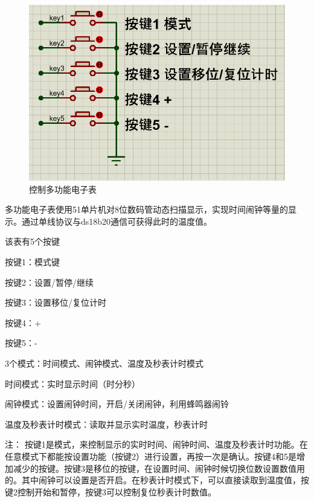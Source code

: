 \documentclass{textreportclass}  %
\begin{document}
	\begin{figure}[htbp]
		\centering
		\includegraphics[scale=0.3]{Fig/控制区二.png}
		\caption{控制多功能电子表}\label{Fig.37}
	\end{figure}
	
	多功能电子表使用51单片机对8位数码管动态扫描显示，实现时间闹钟等量的显示。通过单线协议与ds18b20通信可获得此时的温度值。
	
	该表有5个按键
	
	按键1：模式键
	
	按键2：设置/暂停/继续
	
	按键3：设置移位/复位计时
	
	按键4：+
	
	按键5：-
	
	3个模式：时间模式、闹钟模式、温度及秒表计时模式
	
	时间模式：实时显示时间（时分秒）
	
	闹钟模式：设置闹钟时间，开启/关闭闹钟，利用蜂鸣器闹铃
	
	温度及秒表计时模式：读取并显示实时温度，秒表计时
	
	注：
	按键1是模式，来控制显示的实时时间、闹钟时间、温度及秒表计时功能。在任意模式下都能按设置功能（按键2）进行设置，再按一次是确认。按键4和5是增加减少的按键。按键3是移位的按键，在设置时间、闹钟时候切换位数设置数值用的。其中闹钟可以设置是否开启。在秒表计时模式下，可以直接读取到温度值，按键2控制开始和暂停，按键3可以控制复位秒表计时数值。
	
\end{document}
